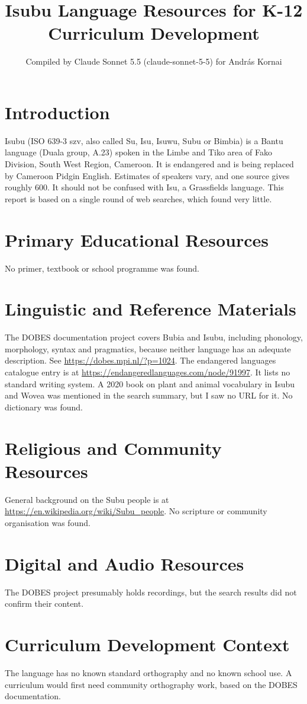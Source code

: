 \documentclass[12pt]{article}
\title{Isubu Language Resources for K-12 Curriculum Development}
\author{Compiled by Claude Sonnet 5.5 (claude-sonnet-5-5) for Andr\'as Kornai}
\date{}
\begin{document}
\maketitle

\section{Introduction}
Isubu (ISO 639-3 szv, also called Su, Isu, Isuwu, Subu or Bimbia) is a Bantu language (Duala group, A.23) spoken in the Limbe and Tiko area of Fako Division, South West Region, Cameroon. It is endangered and is being replaced by Cameroon Pidgin English. Estimates of speakers vary, and one source gives roughly 600. It should not be confused with Isu, a Grassfields language. This report is based on a single round of web searches, which found very little.

\section{Primary Educational Resources}
No primer, textbook or school programme was found.

\section{Linguistic and Reference Materials}
The DOBES documentation project covers Bubia and Isubu, including phonology, morphology, syntax and pragmatics, because neither language has an adequate description. See \url{https://dobes.mpi.nl/?p=1024}. The endangered languages catalogue entry is at \url{https://endangeredlanguages.com/node/91997}. It lists no standard writing system. A 2020 book on plant and animal vocabulary in Isubu and Wovea was mentioned in the search summary, but I saw no URL for it. No dictionary was found.

\section{Religious and Community Resources}
General background on the Subu people is at \url{https://en.wikipedia.org/wiki/Subu_people}. No scripture or community organisation was found.

\section{Digital and Audio Resources}
The DOBES project presumably holds recordings, but the search results did not confirm their content.

\section{Curriculum Development Context}
The language has no known standard orthography and no known school use. A curriculum would first need community orthography work, based on the DOBES documentation.
\end{document}
